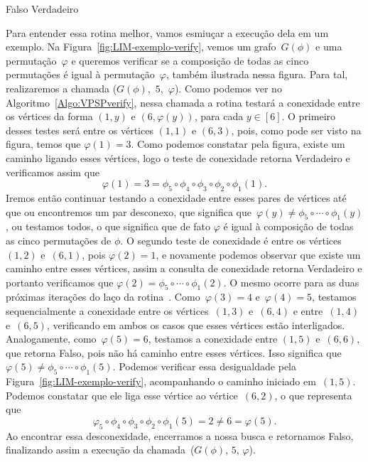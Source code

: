 \begin{algorithm}[htb]
\caption{\VPSPverify($G(\phi)$, $i$, $\varphi$)}
\label{Algo:VPSPverify}
\begin{algorithmic}[1]
    \State \Return Falso
  \EndIf
\EndFor
\State \Return Verdadeiro
\end{algorithmic}
\end{algorithm}

Para entender essa rotina melhor, vamos esmiuçar a execução dela em um exemplo. Na Figura~\ref{fig:LIM-exemplo-verify}, vemos um grafo~$G(\phi)$ e uma permutação~$\varphi$ e queremos verificar se a composição de todas as cinco permutações é igual à permutação~$\varphi$, também ilustrada nessa figura. Para tal, realizaremos a chamada \mbox{\VPSPverify($G(\phi)$, $5$, $\varphi$)}. Como podemos ver no Algoritmo~\ref{Algo:VPSPverify}, nessa chamada a rotina \VPSPverify{} testará a conexidade entre os vértices da forma $(1,y)$ e $(6,\varphi(y))$, para cada $y\in [6]$. O primeiro desses testes será entre os vértices $(1,1)$ e $(6,3)$, pois, como pode ser visto na figura, temos que $\varphi(1) = 3$. Como podemos constatar pela figura, existe um caminho ligando esses vértices, logo o teste de conexidade retorna Verdadeiro e verificamos assim que
$$
\varphi(1) = 3 = \phi_5\circ \phi_4\circ \phi_3\circ \phi_2\circ \phi_1(1).
$$
Iremos então continuar testando a conexidade entre esses pares de vértices até que ou encontremos um par desconexo, que significa que~$\varphi(y) \neq \phi_5\circ\cdots\circ \phi_1(y)$, ou testamos todos, o que significa que de fato $\varphi$ é igual à composição de todas as cinco permutações de $\phi$. O segundo teste de conexidade é entre os vértices~$(1,2)$ e~$(6,1)$, pois $\varphi(2)=1$, e novamente podemos observar que existe um caminho entre esses vértices, assim a consulta de conexidade retorna Verdadeiro e portanto verificamos que $\varphi(2) = \phi_5\circ\cdots\circ \phi_1(2)$. O mesmo ocorre para as duas próximas iterações do laço da rotina~\VPSPverify{}. Como~$\varphi(3)=4$ e~$\varphi(4)=5$, testamos sequencialmente a conexidade entre os vértices~$(1,3)$ e~$(6,4)$ e entre~$(1,4)$ e~$(6,5)$, verificando em ambos os casos que esses vértices estão interligados. Analogamente, como~$\varphi(5)=6$, testamos a conexidade entre $(1,5)$ e~$(6,6)$, que retorna Falso, pois não há caminho entre esses vértices. Isso significa que~$\varphi(5)\neq \phi_5\circ\cdots\circ \phi_1(5)$. Podemos verificar essa desigualdade pela Figura~\ref{fig:LIM-exemplo-verify}, acompanhando o caminho iniciado em~$(1,5)$. Podemos constatar que ele liga esse vértice ao vértice~$(6,2)$, o que representa que
$$
 \varphi_5\circ \phi_4\circ \phi_3\circ \phi_2\circ \phi_1(5) = 2 \neq 6 = \varphi(5).
$$
Ao encontrar essa desconexidade, encerramos a nossa busca e retornamos Falso, finalizando assim a execução da chamada~\VPSPverify($G(\phi)$, $5$, $\varphi$).

